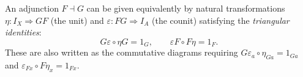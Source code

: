 An adjunction $F \dashv G$ can be given equivalently by natural transformations $\eta: I_X \Rightarrow GF$ (the unit) and $\varepsilon: FG \Rightarrow I_A$ (the counit) satisfying the \emph{triangular identities}:
$$G\varepsilon \circ \eta G = 1_G, \qquad \varepsilon F \circ F\eta = 1_F.$$
These are also written as the commutative diagrams requiring $G\varepsilon_a \circ \eta_{Ga} = 1_{Ga}$ and $\varepsilon_{Fx} \circ F\eta_x = 1_{Fx}$.

